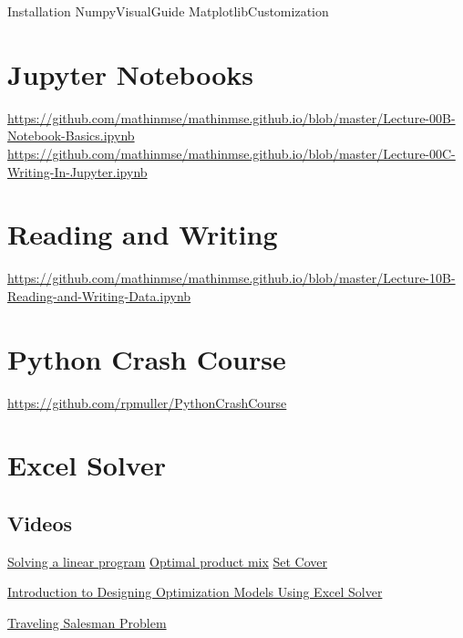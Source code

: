 \documentclass[letter,12pt]{book}
\renewcommand{\0}{\mathbf{0}}
\begin{document}
	
{Installation} %
{NumpyVisualGuide} %
{MatplotlibCustomization} %

\section{Jupyter Notebooks}
\url{https://github.com/mathinmse/mathinmse.github.io/blob/master/Lecture-00B-Notebook-Basics.ipynb}
\url{https://github.com/mathinmse/mathinmse.github.io/blob/master/Lecture-00C-Writing-In-Jupyter.ipynb}

\section{Reading and Writing}
\url{https://github.com/mathinmse/mathinmse.github.io/blob/master/Lecture-10B-Reading-and-Writing-Data.ipynb}

\section{Python Crash Course}
\url{https://github.com/rpmuller/PythonCrashCourse}


\section{Excel Solver}
\subsection{Videos}
\href{https://www.youtube.com/watch?v=V5DmekIFenA}{Solving a linear program}
\href{https://www.youtube.com/watch?v=6xa1x_Iqjzg}{Optimal product mix}
\href{https://www.youtube.com/watch?v=vpodCzRtUMU}{Set Cover}

\href{https://www.youtube.com/watch?v=tKV24jzZ10s}{Introduction to Designing Optimization Models Using Excel Solver}

\href{https://www.youtube.com/watch?v=-E3rSoClgMI}{Traveling Salesman Problem}
\end{document}
